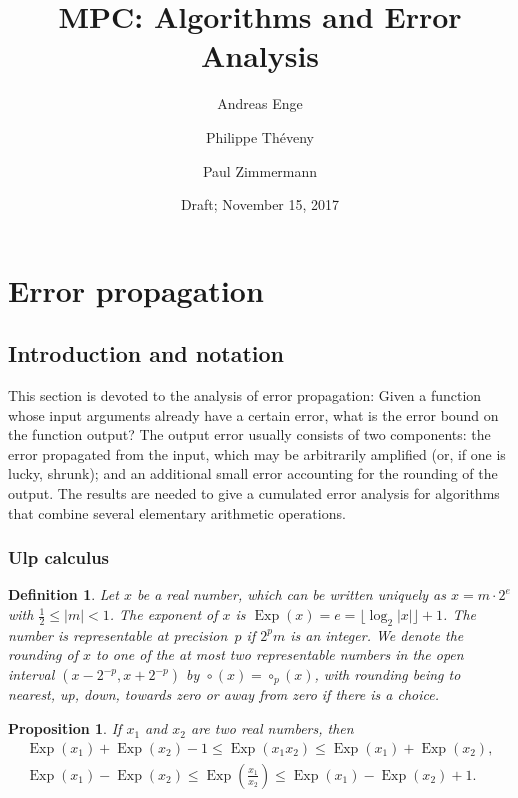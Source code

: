 \documentclass [11pt]{article}
\title {MPC: Algorithms and Error Analysis}
\author {Andreas Enge \and Philippe Th\'eveny \and Paul Zimmermann}
\date {Draft; November 15, 2017}
\DeclareMathOperator{\Exp}{\operatorname {Exp}}
\newcommand {\round}{\operatorname {\circ}}
\renewcommand {\leq}{\leqslant}
\newtheorem{definition}[theorem]{Definition}
\newtheorem{prop}[theorem]{Proposition}
\begin{document}
\maketitle
\tableofcontents


\section {Error propagation}

\subsection {Introduction and notation}

This section is devoted to the analysis of error propagation: Given a function
whose input arguments already have a certain error, what is the error bound on
the function output? The output error usually consists of two components: the
error propagated from the input, which may be arbitrarily amplified (or, if
one is lucky, shrunk); and an
additional small error accounting for the rounding of the output. The results
are needed to give a cumulated error analysis for algorithms that combine
several elementary arithmetic operations.


\subsubsection {Ulp calculus}

\begin {definition}
\label {def:exp}
Let $x$ be a real number, which can be written uniquely as
$x = m \cdot 2^e$ with $\frac{1}{2} \le |m| < 1$.
The {\em exponent} of $x$ is
$\Exp(x) = e = \lfloor \log_2 |x| \rfloor + 1$.
The number is {\em representable at precision~$p$} if
$2^p m$ is an integer.
We denote the rounding of $x$ to one of the at most two representable
numbers in the open interval $(x - 2^{-p}, x + 2^{-p})$ by
$\round (x) = \round_p (x)$, with rounding being to nearest, up, down,
towards zero or away from zero if there is a choice.
\end {definition}

\begin {prop}
\label {prop:expmuldiv}
If $x_1$ and $x_2$ are two real numbers, then
\begin {gather*}
\Exp (x_1) + \Exp (x_2) - 1 \leq \Exp (x_1 x_2) \leq \Exp (x_1) + \Exp (x_2),
\\
\Exp (x_1) - \Exp (x_2) \leq \Exp \left( \frac {x_1}{x_2} \right)
\leq \Exp (x_1) - \Exp (x_2) + 1.
\end {gather*}
\end {prop}
\end{document}
